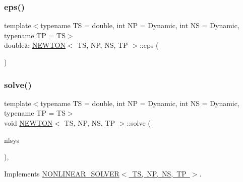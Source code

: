 \subsubsection{\texorpdfstring{eps()}{eps()}}
{\footnotesize\ttfamily template$<$typename TS  = double, int NP = Dynamic, int NS = Dynamic, typename TP  = TS$>$ \\
double\& \mbox{\hyperlink{class_n_e_w_t_o_n}{N\+E\+W\+T\+ON}}$<$ TS, NP, NS, TP $>$\+::eps (\begin{DoxyParamCaption}{ }\end{DoxyParamCaption})\hspace{0.3cm}{\ttfamily [inline]}}

\mbox{\label{class_n_e_w_t_o_n_a1dd31b882567d3e0427eb53ce169f0ce}} 
\subsubsection{\texorpdfstring{solve()}{solve()}}
{\footnotesize\ttfamily template$<$typename TS  = double, int NP = Dynamic, int NS = Dynamic, typename TP  = TS$>$ \\
void \mbox{\hyperlink{class_n_e_w_t_o_n}{N\+E\+W\+T\+ON}}$<$ TS, NP, NS, TP $>$\+::solve (\begin{DoxyParamCaption}\item[{\mbox{\hyperlink{class_n_o_n_l_i_n_e_a_r___s_y_s_t_e_m}{N\+O\+N\+L\+I\+N\+E\+A\+R\+\_\+\+S\+Y\+S\+T\+EM}}$<$ TS, NP, NS, TP $>$ \&}]{nlsys }\end{DoxyParamCaption})\hspace{0.3cm}{\ttfamily [inline]}, {\ttfamily [virtual]}}



Implements \mbox{\hyperlink{class_n_o_n_l_i_n_e_a_r___s_o_l_v_e_r_aae333fb75e2d5d8baa0e37991bfac7c4}{N\+O\+N\+L\+I\+N\+E\+A\+R\+\_\+\+S\+O\+L\+V\+E\+R$<$ T\+S, N\+P, N\+S, T\+P $>$}}.

